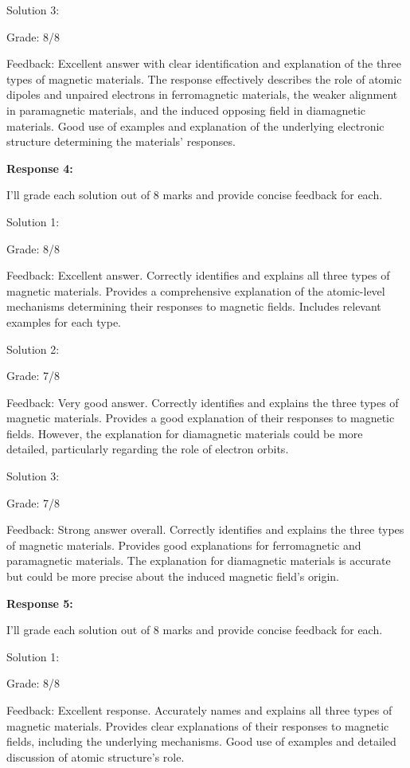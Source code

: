 \documentclass[a4paper,11pt]{article}
\begin{document}
Solution 3:

Grade: 8/8

Feedback: Excellent answer with clear identification and explanation of the three types of magnetic materials. The response effectively describes the role of atomic dipoles and unpaired electrons in ferromagnetic materials, the weaker alignment in paramagnetic materials, and the induced opposing field in diamagnetic materials. Good use of examples and explanation of the underlying electronic structure determining the materials' responses.

\bigskip
\textbf{Response 4:}

I'll grade each solution out of 8 marks and provide concise feedback for each.

Solution 1:

Grade: 8/8

Feedback: Excellent answer. Correctly identifies and explains all three types of magnetic materials. Provides a comprehensive explanation of the atomic-level mechanisms determining their responses to magnetic fields. Includes relevant examples for each type.

Solution 2:

Grade: 7/8

Feedback: Very good answer. Correctly identifies and explains the three types of magnetic materials. Provides a good explanation of their responses to magnetic fields. However, the explanation for diamagnetic materials could be more detailed, particularly regarding the role of electron orbits.

Solution 3:

Grade: 7/8

Feedback: Strong answer overall. Correctly identifies and explains the three types of magnetic materials. Provides good explanations for ferromagnetic and paramagnetic materials. The explanation for diamagnetic materials is accurate but could be more precise about the induced magnetic field's origin.

\bigskip
\textbf{Response 5:}

I'll grade each solution out of 8 marks and provide concise feedback for each.

Solution 1:

Grade: 8/8

Feedback: Excellent response. Accurately names and explains all three types of magnetic materials. Provides clear explanations of their responses to magnetic fields, including the underlying mechanisms. Good use of examples and detailed discussion of atomic structure's role.
\end{document}
